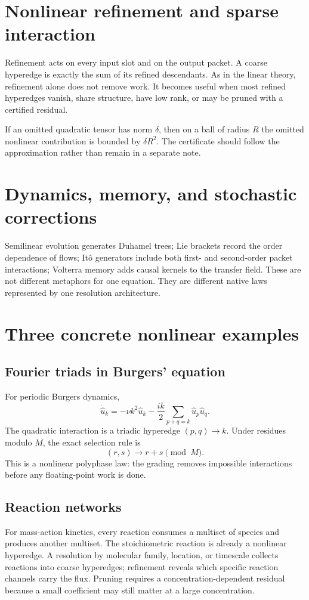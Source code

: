 \documentclass[11pt,oneside]{book}
\theoremstyle{remark}
\begin{document}
\section{Nonlinear refinement and sparse interaction}
Refinement acts on every input slot and on the output packet.  A coarse hyperedge is exactly the sum of its refined descendants.  As in the linear theory, refinement alone does not remove work.  It becomes useful when most refined hyperedges vanish, share structure, have low rank, or may be pruned with a certified residual.

If an omitted quadratic tensor has norm \(\delta\), then on a ball of radius \(R\) the omitted nonlinear contribution is bounded by \(\delta R^2\).  The certificate should follow the approximation rather than remain in a separate note.

\section{Dynamics, memory, and stochastic corrections}
Semilinear evolution generates Duhamel trees; Lie brackets record the order dependence of flows; It\^o generators include both first- and second-order packet interactions; Volterra memory adds causal kernels to the transfer field.  These are not different metaphors for one equation.  They are different native laws represented by one resolution architecture.


\section{Three concrete nonlinear examples}

\subsection{Fourier triads in Burgers' equation}
For periodic Burgers dynamics,
\[
\dot{\widehat u}_k
=-\nu k^2\widehat u_k
-\frac{ik}{2}\sum_{p+q=k}\widehat u_p\widehat u_q.
\]
The quadratic interaction is a triadic hyperedge \((p,q)\to k\).  Under residues modulo \(M\), the exact selection rule is
\[
(r,s)\longrightarrow r+s\pmod M.
\]
This is a nonlinear polyphase law: the grading removes impossible interactions before any floating-point work is done.

\subsection{Reaction networks}
For mass-action kinetics, every reaction consumes a multiset of species and produces another multiset.  The stoichiometric reaction is already a nonlinear hyperedge.  A resolution by molecular family, location, or timescale collects reactions into coarse hyperedges; refinement reveals which specific reaction channels carry the flux.  Pruning requires a concentration-dependent residual because a small coefficient may still matter at a large concentration.
\end{document}
